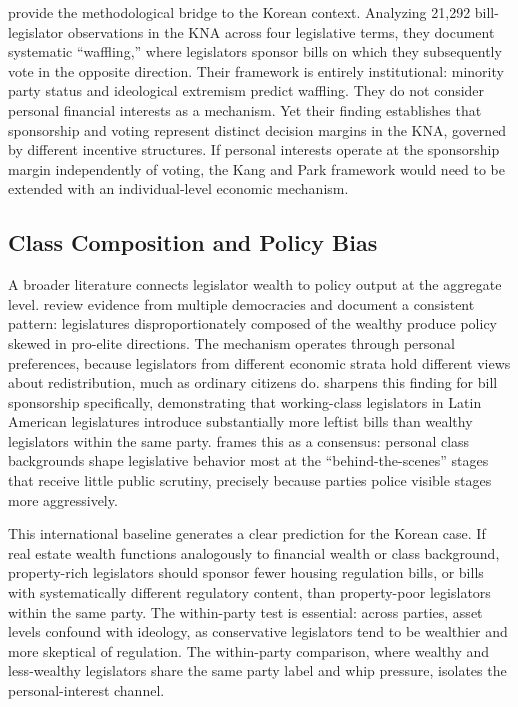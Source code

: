 \documentclass[11pt]{article}
\begin{document}
\citet{kangpark2025} provide the methodological bridge to the Korean context. Analyzing 21,292 bill-legislator observations in the KNA across four legislative terms, they document systematic ``waffling,'' where legislators sponsor bills on which they subsequently vote in the opposite direction. Their framework is entirely institutional: minority party status and ideological extremism predict waffling. They do not consider personal financial interests as a mechanism. Yet their finding establishes that sponsorship and voting represent distinct decision margins in the KNA, governed by different incentive structures. If personal interests operate at the sponsorship margin independently of voting, the Kang and Park framework would need to be extended with an individual-level economic mechanism.

\subsection{Class Composition and Policy Bias}

A broader literature connects legislator wealth to policy output at the aggregate level. \citet{carneslupu2023} review evidence from multiple democracies and document a consistent pattern: legislatures disproportionately composed of the wealthy produce policy skewed in pro-elite directions. The mechanism operates through personal preferences, because legislators from different economic strata hold different views about redistribution, much as ordinary citizens do. \citet{lupu2015} sharpens this finding for bill sponsorship specifically, demonstrating that working-class legislators in Latin American legislatures introduce substantially more leftist bills than wealthy legislators within the same party. \citet{pontusson2015} frames this as a consensus: personal class backgrounds shape legislative behavior most at the ``behind-the-scenes'' stages that receive little public scrutiny, precisely because parties police visible stages more aggressively.

This international baseline generates a clear prediction for the Korean case. If real estate wealth functions analogously to financial wealth or class background, property-rich legislators should sponsor fewer housing regulation bills, or bills with systematically different regulatory content, than property-poor legislators within the same party. The within-party test is essential: across parties, asset levels confound with ideology, as conservative legislators tend to be wealthier and more skeptical of regulation. The within-party comparison, where wealthy and less-wealthy legislators share the same party label and whip pressure, isolates the personal-interest channel.
\end{document}
